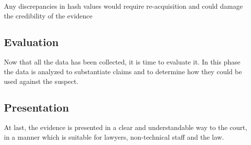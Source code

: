 \begin{boxH}
  Any discrepancies in hash values would require re-acquisition and
  could damage the credibility of the evidence
\end{boxH}



\subsection{Evaluation}
Now that all the data has been collected, it is time to evaluate it.
In this phase the data is analyzed to substantiate claims and to
determine how they could be used against the suspect.
\subsection{Presentation}
At last, the evidence is presented in a clear and understandable way
to the court, in a manner which is suitable for lawyers, non-technical 
staff and the law.
